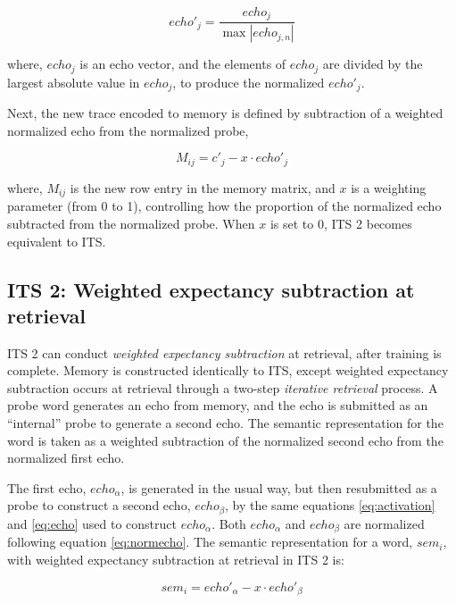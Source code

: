 \documentclass[10pt,letterpaper]{article}
\begin{document}
\begin{equation}
echo'_j = \frac{echo_j}{\max | echo_{j,n} |}
\label{eq:normecho}
\end{equation}

\noindent where, \(echo_j\) is an echo vector, and the elements of \(echo_j\) are divided by the largest absolute value in \(echo_j\), to produce the normalized \(echo'_j\).

Next, the new trace encoded to memory is defined by subtraction of a weighted normalized echo from the normalized probe,

\begin{equation}
M_{ij} = c'_j  - x \cdot echo'_j
\label{eq:ITS2encoding}
\end{equation}

\noindent where, \(M_{ij}\) is the new row entry in the memory matrix, and \(x\) is a weighting parameter (from 0 to 1), controlling how the proportion of the normalized echo subtracted from the normalized probe. When \(x\) is set to 0, ITS 2 becomes equivalent to ITS.

\subsection{ITS 2: Weighted expectancy subtraction at retrieval}

ITS 2 can conduct \emph{weighted expectancy subtraction} at retrieval, after training is complete. Memory is constructed identically to ITS, except weighted expectancy subtraction occurs at retrieval through a two-step \emph{iterative retrieval} process. A probe word generates an echo from memory, and the echo is submitted as an ``internal'' probe to generate a second echo. The semantic representation for the word is taken as a weighted subtraction of the normalized second echo from the normalized first echo.

The first echo, \(echo_\alpha\), is generated in the usual way, but then resubmitted as a probe to construct a second echo, \(echo_\beta\), by the same equations \ref{eq:activation} and \ref{eq:echo} used to construct \(echo_\alpha\). Both \(echo_\alpha\) and \(echo_\beta\) are normalized following equation \ref{eq:normecho}. The semantic representation for a word, $sem_i$, with weighted expectancy subtraction at retrieval in ITS 2 is:

\begin{equation}
sem_i = echo'_\alpha - x \cdot echo'_\beta
\label{eq:ITS2retrieval}
\end{equation}
\end{document}
